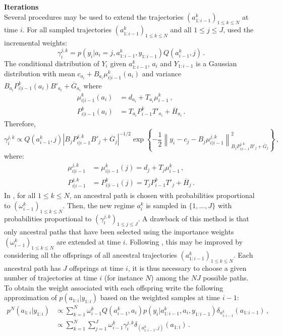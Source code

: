 \documentclass[nolayout]{article}
\theoremstyle{plain}
\theoremstyle{definition}
\newcommand{\1}{\mathbbm{1}}
\def\barG{\overline{G}}
\def\barH{\overline{H}}
\def\eqsp{\,}
\newcommand{\normMat}[2]{\left\|#2\right\|_{#1}}
\begin{document}
\noindent\textbf{Iterations}\\
Several procedures may be used to extend the trajectories $(a^k_{1:i-1})_{1\le k \le N}$ at time $i$.
For all sampled trajectories $(a_{1:i-1}^k)_{1\le k \le N}$ and all $1\le j \le J$,  \cite{chen:liu:2000} used the incremental weights:
\[
\gamma_i^{j,k} = p(y_i | a_i = j, a_{1:i-1}^k, y_{1:i-1}) Q(a_{i-1}^k,j)\eqsp.
\]
The conditional distribution of $Y_i$ given $a^k_{1:i-1}$, $a_i$ and $Y_{1:i-1}$ is a Gaussian distribution with mean $c_{a_i}+B_{a_i}\mu^k_{i|i-1}(a_i)$ and variance $B_{a_i}P^k_{i|i-1}(a_i)B'_{a_i} + \barG_{a_i}$ where 
\begin{align*}
\mu^{k}_{i|i-1}(a_i) &= d_{a_i} + T_{a_i}\mu^k_{i-1}\eqsp,\\
P^{k}_{i|i-1}(a_i) &= T_{a_i}P^k_{i-1}T'_{a_i} + \barH_{a_i}\eqsp.
\end{align*} 
Therefore,
\[
\gamma_i^{j,k} \propto  Q(a_{i-1}^k,j)|B_jP^{j,k}_{i|i-1}B'_j + \barG_j|^{-1/2}\exp\left\{-\frac{1}{2}\normMat{B_jP^{j,k}_{i|i-1}B'_j + \barG_j}{y_i-c_{j}-B_j\mu^{j,k}_{i|i-1}}^2\right\} \eqsp,
\]
where:  
\begin{align}
\mu^{j,k}_{i|i-1} &= \mu^{k}_{i|i-1}(j) = d_{j} + T_{j}\mu^k_{i-1}\eqsp,\label{eq:mui|i-1}\\
P^{j,k}_{i|i-1} &= P^{k}_{i|i-1}(j) = T_{j}P^k_{i-1}T'_{j} + \barH_{j}\eqsp.\label{eq:Pi|i-1}
\end{align} 
In \cite{chen:liu:2000}, for all $1\le k \le N$, an ancestral path is chosen with probabilities proportional to  $(\omega^k_{i-1})_{1\le k \le N}$. Then, the new regime $a_i^k$ is sampled in  $\{1,\ldots, J\}$ with probabilities proportional to $(\gamma_i^{j,k})_{1\le j\le J}$. A drawback of this method is that only ancestral paths that have been selected using the importance weights $(\omega^k_{i-1})_{1\le k \le N}$ are extended at time $i$. Following \cite{barembruch:garivier:moulines:2008}, this may be improved by considering all the offsprings of all ancestral trajectories $(a_{1:i-1}^k)_{1\le k \le N}$. Each ancestral path has $J$ offsprings at time $i$, it is thus necessary to choose a given number of trajectories at time $i$ (for instance $N$) among the $NJ$ possible paths. To obtain the weight associated with each offspring write the following approximation of  $p(a_{1:i}|y_{1:i})$ based on the weighted samples at time $i-1$:
\begin{align*}
p^N(a_{1:i}|y_{1:i})&\propto \sum_{k=1}^N\omega^k_{i-1}Q(a^k_{i-1},a_i)p(y_i|a^k_{1:i-1},a_i,y_{1:i-1})\delta_{a^k_{1:i-1}}(a_{1:i-1})\eqsp,\\
&\propto \sum_{k=1}^N\sum_{j=1}^J\omega^k_{i-1}\gamma_i^{j,k}\delta_{(a^k_{1:i-1},j)}(a_{1:i})\eqsp.
\end{align*}
\end{document}
